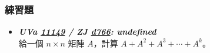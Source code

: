 \subsubsection*{練習題}
\begin{itemize}[label={\Checkmark}]
\item \textbf{\textit{UVa \href{http://uva.onlinejudge.org/external/111/11149.html}{11149} / ZJ \href{http://zerojudge.tw/ShowProblem?problemid=d766}{d766}: undefined}}\\
給一個 $n\times{n}$ 矩陣 $A$，計算 $A+A^2+A^3+\cdots{}+A^k$。
\end{itemize}